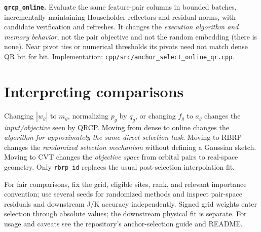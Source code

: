 \documentclass[10pt,a4paper]{article}
\newcommand{\code}[1]{\texttt{#1}}
\begin{document}
\textbf{\code{qrcp\_online}.} Evaluate the same feature-pair columns in bounded
batches, incrementally maintaining Householder reflectors and residual norms,
with candidate verification and refreshes. It changes the \emph{execution
algorithm and memory behavior}, not the pair objective and not the random
embedding (there is none). Near pivot ties or numerical thresholds its pivots
need not match dense QR bit for bit. Implementation:
\code{cpp/src/anchor\_select\_online\_qr.cpp}.

\section{Interpreting comparisons}
Changing $|w_g|$ to $m_g$, normalizing $p_g$ by $q_g$, or changing $f_g$ to
$a_g$ changes the \emph{input/objective} seen by QRCP. Moving from dense to
online changes the \emph{algorithm for approximately the same direct
selection task}. Moving to RBRP changes the \emph{randomized selection
mechanism} without defining a Gaussian sketch. Moving to CVT changes the
\emph{objective space} from orbital pairs to real-space geometry. Only
\code{rbrp\_id} replaces the usual post-selection interpolation fit.

For fair comparisons, fix the grid, eligible sites, rank, and relevant
importance convention; use several seeds for randomized methods and inspect
pair-space residuals and downstream J/K accuracy independently. Signed grid
weights enter selection through absolute values; the downstream physical fit
is separate. For usage and caveats see the repository's anchor-selection guide
and README.
\end{document}
